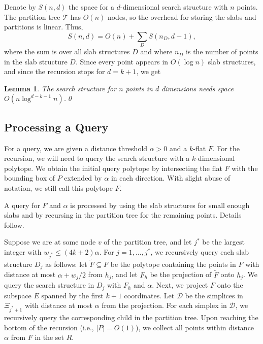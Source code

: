 \documentclass[a4paper,11pt]{paper}
\newtheorem{lemma}[theorem]{Lemma}
\begin{document}
Denote by $S(n,d)$ the space for a $d$-dimensional search
structure with $n$ points.
The partition tree $\mathcal{T}$ has $O(n)$ nodes, so the
overhead for storing the slabs and partitions is linear.
Thus,
\[
  S(n, d) = O(n) + \sum_{D} S(n_D, d - 1),
\]
where the sum is over all slab structures $D$ and where $n_D$ is the
number of points in the slab structure $D$. Since every
point appears in $O(\log n)$ slab structures, and since the
recursion stops for $d = k+1$, we get
\begin{lemma}
 \label{lem:space}
 The search structure for $n$ points in $d$ dimensions needs space
$O(n\log^{d-k-1} n)$.\qed
\end{lemma}

\subsection{Processing a Query}

For a query, we are given a distance threshold $\alpha > 0$ and a
$k$-flat $F$. For the recursion, we will need to query
the search structure with a $k$-dimensional
polytope.  We obtain the initial query polytope by
intersecting the flat $F$ with the bounding box of $P$
extended by $\alpha$ in each direction. With  slight abuse of
notation, we still call this polytope $F$.

A query for $F$ and $\alpha$ is processed by using the
slab structures for small enough slabs and by recursing in
the partition tree for the remaining points. Details follow.

Suppose we are at some node $v$ of the partition tree, and
let $j^*$ be the largest integer
with $w_{j^*} \leq (4k+2)\alpha$. For $j = 1, \dots, j^*$, we
recursively query each slab structure $D_j$ as follows: let
$\widetilde{F} \subseteq F$ be the polytope containing the points
in $F$ with distance at most $\alpha + w_j/2$
from $h_j$, and let $F_h$ be the projection of $\widetilde{F}$
onto $h_j$.  We
query the search structure in $D_j$ with $F_h$ and $\alpha$.
Next, we project $F$ onto the
subspace $E$ spanned by the first $k+1$ coordinates.
Let $\mathcal{D}$ be the simplices in $\Xi_{j^*+1}$ with
distance at most $\alpha$ from the projection.  For each simplex
in $\mathcal{D}$, we recursively query the corresponding child in
the partition tree. Upon reaching the bottom of the recursion
(i.e., $|P| = O(1)$), we collect all points within distance
$\alpha$ from $F$ in the set $R$.
\end{document}
